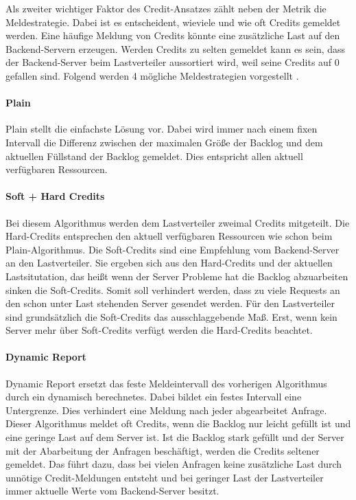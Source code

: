 \documentclass[a4paper, 12pt, BCOR10mm, DIV12, toc=bibliography, toc=listof, german]{scrbook}
\begin{document}
	Als zweiter wichtiger Faktor des Credit-Ansatzes zählt neben der Metrik die Meldestrategie. Dabei
	ist es entscheident, wieviele und wie oft Credits gemeldet werden. Eine häufige Meldung von Credits
	könnte eine zusätzliche Last auf den Backend-Servern erzeugen. Werden Credits zu selten gemeldet
	kann es sein, dass der Backend-Server beim Lastverteiler aussortiert wird, weil seine Credits auf
	0 gefallen sind. Folgend werden 4 mögliche Meldestrategien vorgestellt \cite{scsczile2008,
	schneidenbach2009}.
	
	\paragraph{Plain} %
	\label{par:plain}

		Plain stellt die einfachste Lösung vor. Dabei wird immer nach einem fixen Intervall die
		Differenz zwischen der maximalen Größe der Backlog und dem aktuellen Füllstand der Backlog
		gemeldet. Dies entspricht allen aktuell verfügbaren Ressourcen.


	\paragraph{Soft + Hard Credits} %
	\label{par:soft-hard-credits}

	Bei diesem Algorithmus werden dem Lastverteiler zweimal Credits mitgeteilt. Die Hard-Credits
	entsprechen den aktuell verfügbaren Ressourcen wie schon beim Plain-Algorithmus. Die Soft-Credits
	sind eine Empfehlung vom Backend-Server an den Lastverteiler. Sie ergeben sich aus den
	Hard-Credits und der aktuellen Lastsitutation, das heißt wenn der Server Probleme hat die Backlog
	abzuarbeiten sinken die Soft-Credits. Somit soll verhindert werden, dass zu viele Requests an den
	schon unter Last stehenden Server gesendet werden. Für den Lastverteiler sind grundsätzlich die
	Soft-Credits das ausschlaggebende Maß. Erst, wenn kein Server mehr über Soft-Credits verfügt
	werden die Hard-Credits beachtet.
	

	\paragraph{Dynamic Report} %
	\label{par:dynamic-report}

	Dynamic Report ersetzt das feste Meldeintervall des vorherigen Algorithmus durch ein dynamisch
	berechnetes. Dabei bildet ein festes Intervall eine Untergrenze. Dies verhindert eine Meldung nach
	jeder abgearbeitet Anfrage. Dieser Algorithmus meldet oft Credits, wenn die Backlog nur leicht
	gefüllt ist und eine geringe Last	auf dem Server ist. Ist die Backlog stark gefüllt und der
	Server mit der Abarbeitung der Anfragen beschäftigt, werden die Credits seltener gemeldet. Das
	führt dazu, dass bei vielen Anfragen keine zusätzliche Last durch unnötige Credit-Meldungen entsteht
	und bei geringer Last der Lastverteiler immer aktuelle Werte vom Backend-Server besitzt.
	
\end{document}
